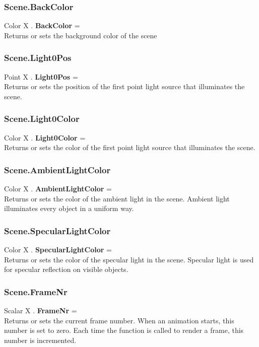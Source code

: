 \subsubsection{Scene.BackColor \label{F:Scene:BackColor}}
Color X . \textbf{BackColor} = \\
Returns or sets the background color of the scene

\subsubsection{Scene.Light0Pos \label{F:Scene:Light0Pos}}
Point X . \textbf{Light0Pos} = \\
Returns or sets the position of the first point light source that illuminates the scene.

\subsubsection{Scene.Light0Color \label{F:Scene:Light0Color}}
Color X . \textbf{Light0Color} = \\
Returns or sets the color of the first point light source that illuminates the scene.

\subsubsection{Scene.AmbientLightColor \label{F:Scene:AmbientLightColor}}
Color X . \textbf{AmbientLightColor} = \\
Returns or sets the color of the ambient light in the scene. Ambient light illuminates every object in a uniform way.

\subsubsection{Scene.SpecularLightColor \label{F:Scene:SpecularLightColor}}
Color X . \textbf{SpecularLightColor} = \\
Returns or sets the color of the specular light in the scene. Specular light is used for specular reflection on visible objects.

\subsubsection{Scene.FrameNr \label{F:Scene:FrameNr}}
Scalar X . \textbf{FrameNr} = \\
Returns or sets the current frame number. When an animation starts, this number is set to zero. Each time the function  is called to render a frame, this number is incremented.

